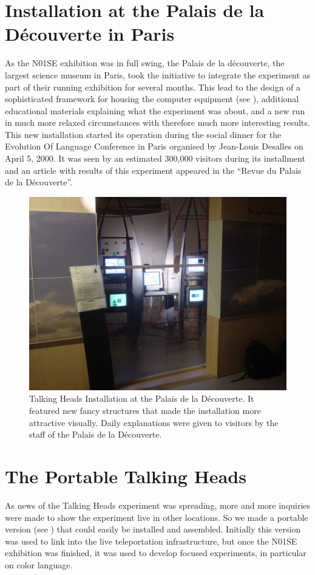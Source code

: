 \section{Installation at the Palais de la D\'{e}couverte in Paris}

As the N01SE exhibition was in full swing, the Palais de la d\'{e}couverte, the largest science museum in Paris, 
took the initiative to integrate the experiment as part of their running exhibition for several months. This lead 
to the design of a sophisticated framework for housing the computer equipment (see ), 
additional educational materials explaining
what the experiment was about, and a new run in much more relaxed circumstances with therefore much more 
interesting results. This new installation started its operation during the social 
dinner for the Evolution Of Language Conference in Paris organised by Jean-Louis Desalles
on April 5, 2000. It was seen by an estimated 300,000 visitors
during its installment and an article with results of this experiment
appeared in the ``Revue du Palais de la D\'{e}couverte''.\cite{Steels:2000kaplan}

\begin{figure}[htbp]
  \centerline{\includegraphics[width=.65\textwidth]{chap9/figs/th4}}
\caption{\label{fig:palais} 
Talking Heads Installation at the Palais de la D\'{e}couverte. It featured new fancy structures that 
made the installation more attractive visually. Daily explanations were given to visitors 
by the staff of the Palais de la D\'{e}couverte.} 
\end{figure}

\section{The Portable Talking Heads} 

As news of the Talking Heads experiment was spreading, more and more inquiries were made to 
show the experiment live in other locations. So we made a portable version (see ) that could easily 
be installed and assembled. Initially this version was used to link into the live 
teleportation infrastructure, but once the N01SE exhibition was finished, it was used to develop focused 
experiments, in particular on color language. 

